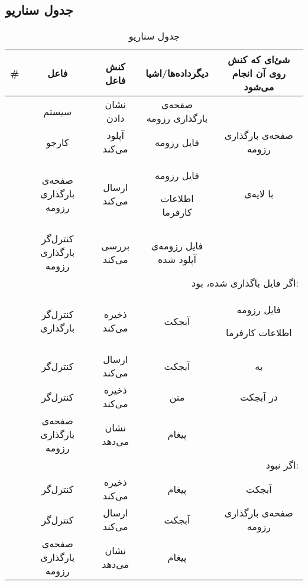 \subsection{جدول سناریو}
\begin{table}[H]
	\caption{جدول سناریو }
	\begin{adjustbox}{width=\textwidth}
		\begin{tabular}{|c|c|c|c|c|}
			\hline		
			\# & فاعل & کنش فاعل & دیگرداده‌ها/اشیا & شئ‌ای که کنش روی آن انجام می‌شود \\
			\hline
			\hline
			\sstep & 		
			سیستم &			
			نشان دادن &
			صفحه‌ی بارگذاری رزومه &
			\\
			\hline
			\sstep & 		
			کارجو &			
			آپلود می‌کند &			
			فایل رزومه &			
			صفحه‌ی بارگذاری رزومه \\
			\hline
			\sstep & 		
			صفحه‌ی بارگذاری رزومه &			
			ارسال می‌کند &			
			\begin{inparaitem}
				\item فایل رزومه
				\item اطلاعات کارفرما
			\end{inparaitem}
			&			
			با لایه‌ی \frontend\\
			\hline
			\sstep & 		
			کنترل‌گر بارگذاری رزومه &			
			بررسی می‌کند &			
			فایل رزومه‌ی آپلود شده &			
			\\
			\hline
			\sstep & 		
			\multicolumn{4}{|r|}{اگر فایل باگذاری شده، \lr{PDF} بود:}\\
			\hline
			\sstep & 		
			کنترل‌گر بارگذاری&			
			ذخیره می‌کند &			
			آبجکت \json&			
			\begin{inparaitem}
				\item فایل رزومه
				\item اطلاعات کارفرما
			\end{inparaitem}
			\\
			\hline
			\sstep & 		
			کنترل‌گر &			
			ارسال می‌کند &			
			آبجکت \json &			
			به \gdm\\
			\hline
			\sstep & 		
			کنترل‌گر&			
			ذخیره می‌کند &			
			متن \say{رزومه ارسال شد}&			
			در آبجکت \json \\
			\hline
			\sstep & 		
    		صفحه‌ی بارگذاری رزومه	&
			نشان می‌دهد &			
			پیغام &			
			\\
			\hline
			\sstep & 		
			\multicolumn{4}{|r|}{اگر \lr{PDF} نبود:}\\
			\hline
			\sstep & 		
			کنترل‌گر &			
			ذخیره می‌کند &			
			پیغام \say{...}&			
			آبجکت \json \\
			\hline
			\sstep & 		
			کنترل‌گر &			
			ارسال می‌کند &			
			آبجکت \json &			
			صفحه‌ی بارگذاری رزومه \\
			\hline
			\sstep & 		
			صفحه‌ی بارگذاری رزومه &			
			نشان می‌دهد&			
			پیغام&			
			\\
			\hline
		\end{tabular}
	\end{adjustbox}
\end{table}
\setcounter{MainStepCounter}{0}
\setcounter{SenarioCounter}{0}
